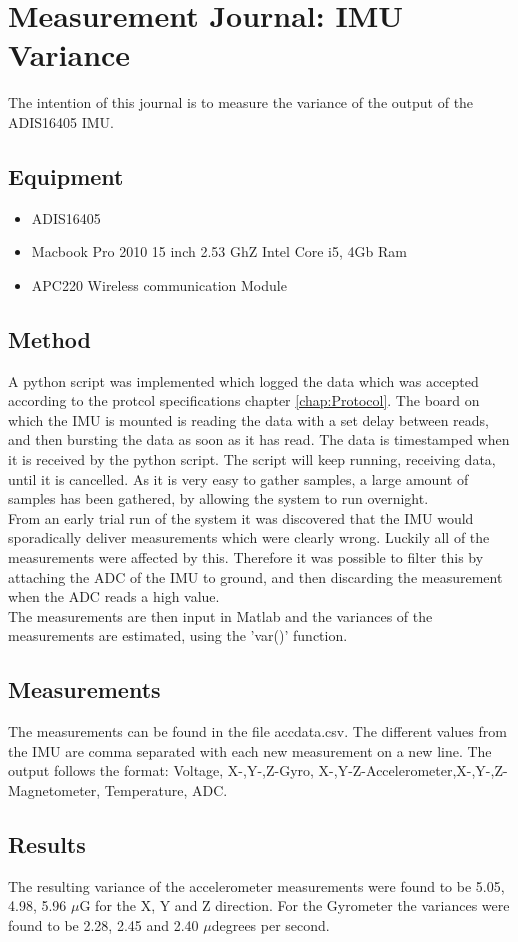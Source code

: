 \chapter{Measurement Journal: IMU Variance}
The intention of this journal is to measure the variance of the output of the ADIS16405 IMU.
\section{Equipment}
\begin{itemize}
\item ADIS16405
\item Macbook Pro 2010 15 inch 2.53 GhZ Intel Core i5, 4Gb Ram
\item APC220 Wireless communication Module
\end{itemize}

\section{Method}
A python script was implemented which logged the data which was accepted according to the protcol specifications chapter \ref{chap:Protocol}. The board on which the IMU is mounted is reading the data with a set delay between reads, and then bursting the data as soon as it has read. The data is timestamped when it is received by the python script. The script will keep running, receiving data, until it is cancelled. As it is very easy to gather samples, a large amount of samples has been gathered, by allowing the system to run overnight.\\
From an early trial run of the system it was discovered that the IMU would sporadically deliver measurements which were clearly wrong. Luckily all of the measurements were affected by this. Therefore it was possible to filter this by attaching the ADC of the IMU to ground, and then discarding the measurement when the ADC reads a high value.\\
The measurements are then input in Matlab and the variances of the measurements are estimated, using the 'var()' function.
\section{Measurements}
The measurements can be found in the file accdata.csv. The different values from the IMU are comma separated with each new measurement on a new line. The output follows the format: Voltage, X-,Y-,Z-Gyro, X-,Y-Z-Accelerometer,X-,Y-,Z-Magnetometer, Temperature, ADC.
\section{Results}
The resulting variance of the accelerometer measurements were found to be 5.05, 4.98, 5.96 $\mu$G for the X, Y and Z direction. 
For the Gyrometer the variances were found to be 2.28, 2.45 and 2.40 $\mu$degrees per second.